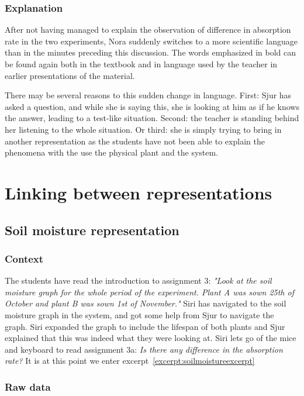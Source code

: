 \subsubsection*{Explanation}
After not having managed to explain the observation of difference in absorption rate in the two experiments, Nora suddenly switches to a more scientific language than in the minutes preceding this discussion. The words emphasized in bold can be found again both in the textbook and in language used by the teacher in earlier presentations of the material. 

There may be several reasons to this sudden change in language. First: Sjur has asked a question, and while she is saying this, she is looking at him as if he knows the answer, leading to a test-like situation. Second: the teacher is standing behind her listening to the whole situation. Or third: she is simply trying to bring in another representation as the students have not been able to explain the phenomena with the use the physical plant and the system. 


\section{Linking between representations}
\label{cha:linking}
\subsection{Soil moisture representation}


\subsubsection*{Context}
The students have read the introduction to assignment 3: \emph{"Look at the soil moisture graph for the whole period of the experiment. Plant A was sown 25th of October and plant B was sown 1st of November."} Siri has navigated to the soil moisture graph in the system, and got some help from Sjur to navigate the graph. Siri expanded the graph to include the lifespan of both plants and Sjur explained that this was indeed what they were looking at. Siri lets go of the mice and keyboard to read assignment 3a: \emph{Is there any difference in the absorption rate?} It is at this point we enter excerpt~\ref{excerpt:soilmoistureexcerpt}



\subsubsection*{Raw data}

